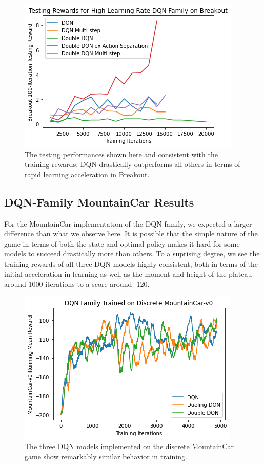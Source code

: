 \documentclass[conference]{IEEEtran}
\begin{document}
\begin{figure}
\centerline{\includegraphics[scale=0.6]{DQNs_breakout_high.png}}
\caption{The testing performances shown here and consistent with the training rewards: DQN drastically outperforms all others in terms of rapid learning acceleration in Breakout.}
\end{figure}

\subsection{DQN-Family MountainCar Results}
For the MountainCar implementation of the DQN family, we expected a larger difference than what we observe here. It is possible that the simple nature of the game in terms of both the state and optimal policy makes it hard for some models to succeed drastically more than others. To a suprising degree, we see the training rewards of all three DQN models highly consistent, both in terms of the initial acceleration in learning as well as the moment and height of the plateau around 1000 iterations to a score around -120.

\begin{figure}
\centerline{\includegraphics[scale=0.6]{DQN_family_car.png}}
\caption{The three DQN models implemented on the discrete MountainCar game show remarkably similar behavior in training.}
\end{figure}
\end{document}
